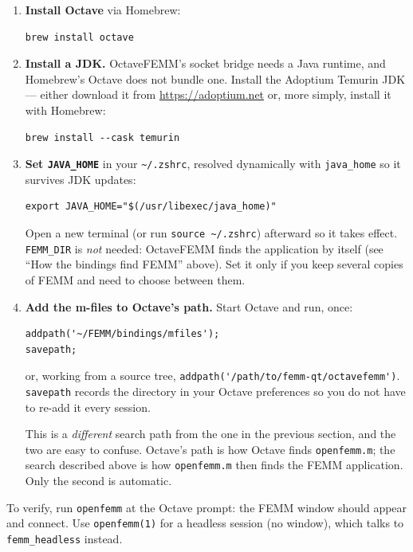 \documentclass[11pt]{article}
\begin{document}
\begin{enumerate}
\item \textbf{Install Octave} via Homebrew:
\begin{lstlisting}
brew install octave
\end{lstlisting}

\item \textbf{Install a JDK.}  OctaveFEMM's socket bridge needs a Java
runtime, and Homebrew's Octave does not bundle one.  Install the Adoptium
Temurin JDK --- either download it from \url{https://adoptium.net} or, more
simply, install it with Homebrew:
\begin{lstlisting}
brew install --cask temurin
\end{lstlisting}

\item \textbf{Set \texttt{JAVA\_HOME}} in your
\texttt{\textasciitilde/.zshrc}, resolved dynamically with
\texttt{java\_home} so it survives JDK updates:
\begin{lstlisting}
export JAVA_HOME="$(/usr/libexec/java_home)"
\end{lstlisting}
Open a new terminal (or run \texttt{source \textasciitilde/.zshrc})
afterward so it takes effect.  \texttt{FEMM\_DIR} is \emph{not} needed:
OctaveFEMM finds the application by itself (see ``How the bindings find
FEMM'' above).  Set it only if you keep several copies of FEMM and need
to choose between them.

\item \textbf{Add the m-files to Octave's path.}  Start Octave and run, once:
\begin{lstlisting}
addpath('~/FEMM/bindings/mfiles');
savepath;
\end{lstlisting}
or, working from a source tree,
\verb+addpath('/path/to/femm-qt/octavefemm')+.  \texttt{savepath} records
the directory in your Octave preferences so you do not have to re-add it
every session.

This is a \emph{different} search path from the one in the previous
section, and the two are easy to confuse.  Octave's path is how Octave
finds \texttt{openfemm.m}; the search described above is how
\texttt{openfemm.m} then finds the FEMM application.  Only the second is
automatic.
\end{enumerate}

To verify, run \texttt{openfemm} at the Octave prompt: the FEMM window should
appear and connect.  Use \texttt{openfemm(1)} for a headless session (no
window), which talks to \texttt{femm\_headless} instead.
\end{document}
